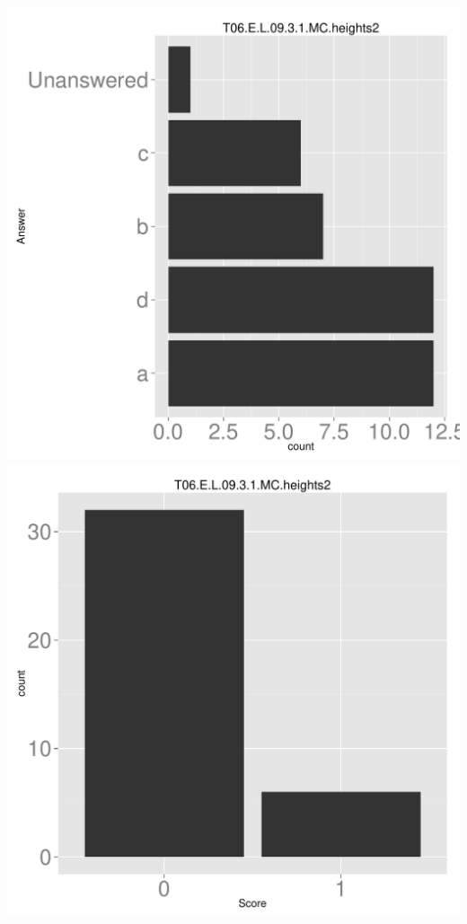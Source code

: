 \documentclass[12pt,nohyper]{tufte-handout}\usepackage[]{graphicx}\usepackage[]{color}
\begin{document}
\begin{center} \includegraphics[width=.45\linewidth]{Topic06_37_answer} \includegraphics[width=.45\linewidth]{Topic06_37_score} \end{center} 
\end{document}
